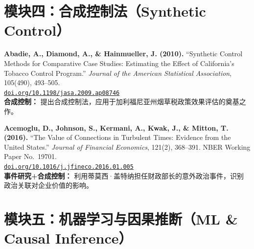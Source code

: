 \documentclass[12pt, a4paper]{article}
\begin{document}
\section*{模块四：合成控制法（Synthetic Control）}

\begin{enumerate}[label=\textbf{[\arabic*]}, leftmargin=*, itemsep=1em, start=14]

\item \textbf{Abadie, A., Diamond, A., \& Hainmueller, J. (2010).}
  ``Synthetic Control Methods for Comparative Case Studies: Estimating the Effect of California's Tobacco Control Program.''
  \emph{Journal of the American Statistical Association}, 105(490), 493--505.\\
  \href{https://doi.org/10.1198/jasa.2009.ap08746}{\texttt{doi.org/10.1198/jasa.2009.ap08746}}\\
  {\small \textcolor{asher}{\textbf{合成控制：} 提出合成控制法，应用于加利福尼亚州烟草税政策效果评估的奠基之作。}}

\item \textbf{Acemoglu, D., Johnson, S., Kermani, A., Kwak, J., \& Mitton, T. (2016).}
  ``The Value of Connections in Turbulent Times: Evidence from the United States.''
  \emph{Journal of Financial Economics}, 121(2), 368--391.
  NBER Working Paper No.\ 19701.\\
  \href{https://doi.org/10.1016/j.jfineco.2016.01.005}{\texttt{doi.org/10.1016/j.jfineco.2016.01.005}}\\
  {\small \textcolor{asher}{\textbf{事件研究+合成控制：} 利用蒂莫西·盖特纳担任财政部长的意外政治事件，识别政治关联对企业价值的影响。}}

\end{enumerate}

\section*{模块五：机器学习与因果推断（ML \& Causal Inference）}
\end{document}
